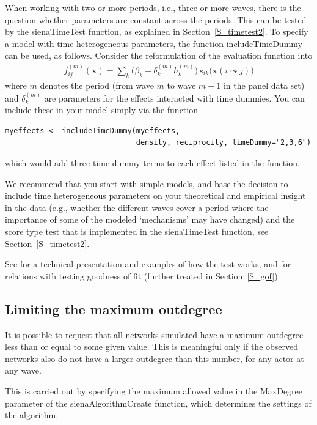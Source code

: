\documentclass[a4paper,fleqn,11pt]{article}
\newcommand{\+}{\, + \,}
\newcommand{\sfn}[1]{\textsf{#1}}
\begin{document}
When working with two or more periods, i.e., three or more waves,
there is the question whether parameters are constant across the periods.
This can be tested by the \sfn{sienaTimeTest} function, as explained
in Section~\ref{S_timetest2}.
To specify a model with time heterogeneous parameters, the function
\sfn{includeTimeDummy} can be used, as follows.
Consider the reformulation of the evaluation function into
\begin{align}
f^{(m)}_{ij}(\mathbf{x})= \sum_k \Big(\beta_k + \delta_k^{(m)} h_k^{(m)}\Big)
                              \,      s_{ik}\big(\mathbf{x}(i \leadsto j)\big)
\label{eq:fmij}
\end{align}
where $m$ denotes the period (from wave $m$ to wave $m+1$
in the panel data set)
and $\delta_k^{(m)}$ are parameters for the effects interacted
with time dummies. You
can include these in your model simply via the function
\begin{verbatim}
myeffects <- includeTimeDummy(myeffects,
                              density, reciprocity, timeDummy="2,3,6")
\end{verbatim}
which would add three time dummy terms to each effect listed in the function.

We recommend that you start with simple models,
and base the decision to include time heterogeneous parameters
on your theoretical and empirical insight in the data
(e.g., whether the different waves cover a period where the importance
of some of the modeled `mechanisms' may have changed) and
the score type test that is implemented in the \sfn{sienaTimeTest} function,
see Section~\ref{S_timetest2}.

See \citet{Lospinoso2011} for a technical presentation
and examples of how the test works,
and \citet{LospinosoSnijders2019} for relations with
testing goodness of fit (further treated in Section~\ref{S_gof}).


\subsection{Limiting the maximum outdegree}
\label{S_maxdegree}

It is possible to request that all networks simulated have a
maximum outdegree less than or equal to some given value.
This is meaningful only if the observed networks also do
not have a larger outdegree than this number, for any actor at any wave.

This is carried out by specifying the maximum allowed value
in the \textsf{MaxDegree} parameter of the \textsf{sienaAlgorithmCreate}
function, which determines the settings of the algorithm.
\end{document}
